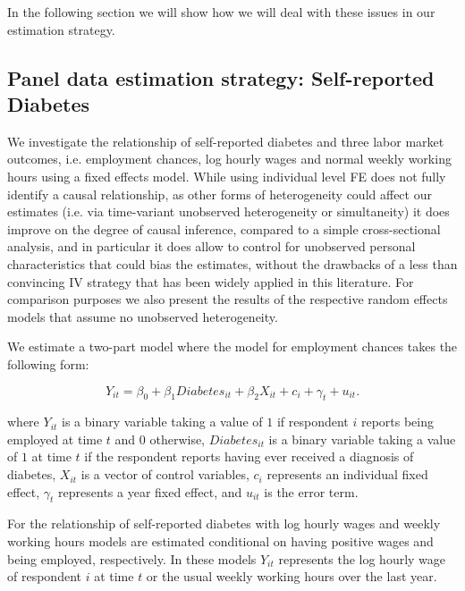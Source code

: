 \documentclass[12pt,english,british]{article}
\begin{document}
In the following section we will show how we will deal with these issues in our estimation strategy.


\subsection{Panel data estimation strategy: Self-reported Diabetes}

We investigate the relationship of self-reported diabetes and three
labor market outcomes, i.e. employment chances, log hourly wages
and normal weekly working hours using a fixed effects model. While using individual level \ac{FE} does not fully
identify a causal relationship, as other forms of heterogeneity could
affect our estimates (i.e. via time-variant unobserved heterogeneity
or simultaneity) it does improve on the degree of causal inference,
compared to a simple cross-sectional analysis, and in particular it
does allow to control for unobserved personal characteristics that
could bias the estimates, without the drawbacks of a less than convincing
\ac{IV} strategy that has been widely applied in this literature. 
For comparison purposes we also present the results of the respective random effects models that assume no unobserved heterogeneity.

We estimate a two-part model where the model for employment chances
takes the following form:

\noindent 
\begin{equation}
Y_{it}=\beta_{0}+\beta_{1}Diabetes_{it}+\beta_{2}X_{it}+c_{i}+\gamma_{t}+u_{it}.\label{eq:employed}
\end{equation}


where $Y_{it}$ is a binary variable taking a value of $1$ if respondent
$i$ reports being employed at time $t$ and $0$ otherwise, $Diabetes_{it}$
is a binary variable taking a value of $1$ at time $t$ if the respondent
reports having ever received a diagnosis of diabetes, $X_{it}$ is
a vector of control variables, $c_{i}$ represents an individual fixed
effect, $\gamma_{t}$ represents a year fixed effect, and $u_{it}$
is the error term.

For the relationship of self-reported diabetes with log hourly wages
and weekly working hours models are estimated conditional on having positive wages and being
employed, respectively. In these models $Y_{it}$ represents the log hourly wage
of respondent $i$ at time $t$ or the usual weekly working hours
over the last year.
\end{document}
